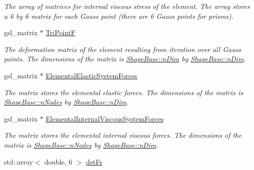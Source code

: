 \begin{DoxyCompactItemize}
\begin{DoxyCompactList}\small\item\em The array of matrices for internal viscous stress of the element. The array stores a 6 by 6 matrix for each Gauss point (there are 6 Gauss points for prisms). \end{DoxyCompactList}\item 
\hypertarget{classShapeBase_ab7ac8f14929ab37e8eae5fcaf93b18a8}{}gsl\+\_\+matrix $\ast$ \hyperlink{classShapeBase_ab7ac8f14929ab37e8eae5fcaf93b18a8}{Tri\+Point\+F}\label{classShapeBase_ab7ac8f14929ab37e8eae5fcaf93b18a8}

\begin{DoxyCompactList}\small\item\em The deformation matrix of the element resulting from iteration over all Gauss points. The dimensions of the matrix is \hyperlink{classShapeBase_a0ae4246d158f4d66b5bd1644df40f150}{Shape\+Base\+::n\+Dim} by \hyperlink{classShapeBase_a0ae4246d158f4d66b5bd1644df40f150}{Shape\+Base\+::n\+Dim}. \end{DoxyCompactList}\item 
\hypertarget{classShapeBase_a94d201c88c73283f2e9711d1cc038e02}{}gsl\+\_\+matrix $\ast$ \hyperlink{classShapeBase_a94d201c88c73283f2e9711d1cc038e02}{Elemental\+Elastic\+System\+Forces}\label{classShapeBase_a94d201c88c73283f2e9711d1cc038e02}

\begin{DoxyCompactList}\small\item\em The matrix stores the elemental elastic forces. The dimensions of the matrix is \hyperlink{classShapeBase_a0daa5629b1335ca3e1be089a006fe897}{Shape\+Base\+::n\+Nodes} by \hyperlink{classShapeBase_a0ae4246d158f4d66b5bd1644df40f150}{Shape\+Base\+::n\+Dim}. \end{DoxyCompactList}\item 
\hypertarget{classShapeBase_a54b5ebd33ad4ed5739c0431bf0d4346d}{}gsl\+\_\+matrix $\ast$ \hyperlink{classShapeBase_a54b5ebd33ad4ed5739c0431bf0d4346d}{Elemental\+Internal\+Viscous\+System\+Forces}\label{classShapeBase_a54b5ebd33ad4ed5739c0431bf0d4346d}

\begin{DoxyCompactList}\small\item\em The matrix stores the elemental internal viscous forces. The dimensions of the matrix is \hyperlink{classShapeBase_a0daa5629b1335ca3e1be089a006fe897}{Shape\+Base\+::n\+Nodes} by \hyperlink{classShapeBase_a0ae4246d158f4d66b5bd1644df40f150}{Shape\+Base\+::n\+Dim}. \end{DoxyCompactList}\item 
\hypertarget{classShapeBase_a01d3d2738b44a003e08a6a6b96c0b91e}{}std\+::array$<$ double, 6 $>$ \hyperlink{classShapeBase_a01d3d2738b44a003e08a6a6b96c0b91e}{det\+Fs}\label{classShapeBase_a01d3d2738b44a003e08a6a6b96c0b91e}


\end{DoxyCompactItemize}
